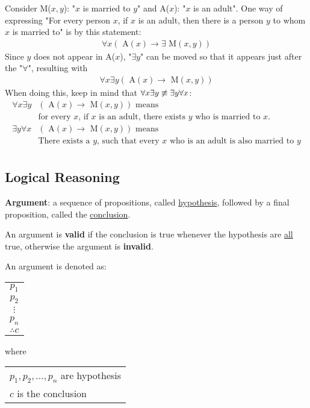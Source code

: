 Consider M($x, y$): "$x$ is married to $y$" and A($x$): "$x$ is an adult".
One way of expressing "For every person $x$, if $x$ is an adult, then
there is a person $y$ to whom $x$ is married to" is by this statement:
\begin{align*}
  \forall x (\text{ A}(x) \rightarrow \exists \text{ M}(x, y))
\end{align*}
Since $y$ does not appear in A($x$), "\(\exists y\)" can be moved so that it appears
just after the "\(\forall\)", resulting with
\begin{align*}
  \forall x \exists y (\text{ A}(x) \rightarrow \text{ M}(x, y))
\end{align*}
When doing this, keep in mind that \(\forall x \exists y \centernot \equiv \exists y \forall x\):
\begin{align*}
  \forall x \exists y & (\text{ A}(x) \rightarrow \text{ M}(x, y)) \text{ means}                              \\
                      & \text{for every $x$, if $x$ is an adult, there exists $y$ who is married to $x$.}     \\
  \exists y \forall x & (\text{ A}(x) \rightarrow \text{ M}(x, y)) \text{ means}                              \\
                      & \text{There exists a $y$, such that every $x$ who is an adult is also married to $y$} \\
\end{align*}

\subsection{Logical Reasoning}

\textbf{Argument}: a sequence of propositions, called \underline{hypothesis}, followed
by a final proposition, called the \underline{conclusion}.

An argument is \textbf{valid} if the conclusion is true whenever the hypothesis
are \underline{all} true, otherwise the argument is \textbf{invalid}.

\begin{center}
  An argument is denoted as:
  \begin{tabular}{c}
    \(p_1\)     \\
    \(p_2\)     \\
    \(\vdots \) \\
    \(p_n\)     \\
    \hline
    \(\therefore c\)
  \end{tabular}
  where
  \begin{tabular}{l}
    \(p_1, p_2, \ldots, p_n\) are hypothesis \\
    \(c\) is the conclusion
  \end{tabular}
\end{center}

